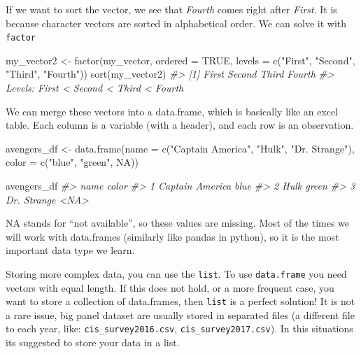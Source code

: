 \documentclass[
]{article}
\newenvironment{Shaded}{\begin{snugshade}}{\end{snugshade}}
\newcommand{\AttributeTok}[1]{\textcolor[rgb]{0.77,0.63,0.00}{#1}}
\newcommand{\CommentTok}[1]{\textcolor[rgb]{0.56,0.35,0.01}{\textit{#1}}}
\newcommand{\ConstantTok}[1]{\textcolor[rgb]{0.00,0.00,0.00}{#1}}
\newcommand{\FunctionTok}[1]{\textcolor[rgb]{0.00,0.00,0.00}{#1}}
\newcommand{\NormalTok}[1]{#1}
\newcommand{\OtherTok}[1]{\textcolor[rgb]{0.56,0.35,0.01}{#1}}
\newcommand{\StringTok}[1]{\textcolor[rgb]{0.31,0.60,0.02}{#1}}
\begin{document}
If we want to sort the vector, we see that \emph{Fourth} comes right after \emph{First}. It is because character vectors are sorted in alphabetical order. We can solve it with \texttt{factor}

\begin{Shaded}
\begin{Highlighting}[]
\NormalTok{my\_vector2 }\OtherTok{\textless{}{-}} \FunctionTok{factor}\NormalTok{(my\_vector, }\AttributeTok{ordered =} \ConstantTok{TRUE}\NormalTok{, }\AttributeTok{levels =} \FunctionTok{c}\NormalTok{(}\StringTok{"First"}\NormalTok{, }\StringTok{"Second"}\NormalTok{, }\StringTok{"Third"}\NormalTok{, }\StringTok{"Fourth"}\NormalTok{))}
\FunctionTok{sort}\NormalTok{(my\_vector2)}
\CommentTok{\#\textgreater{} [1] First  Second Third  Fourth}
\CommentTok{\#\textgreater{} Levels: First \textless{} Second \textless{} Third \textless{} Fourth}
\end{Highlighting}
\end{Shaded}

We can merge these vectors into a data.frame, which is basically like an excel table. Each column is a variable (with a header), and each row is an observation.

\begin{Shaded}
\begin{Highlighting}[]
\NormalTok{avengers\_df }\OtherTok{\textless{}{-}} \FunctionTok{data.frame}\NormalTok{(}\AttributeTok{name =} \FunctionTok{c}\NormalTok{(}\StringTok{"Captain America"}\NormalTok{, }\StringTok{"Hulk"}\NormalTok{, }\StringTok{"Dr. Strange"}\NormalTok{), }
           \AttributeTok{color =} \FunctionTok{c}\NormalTok{(}\StringTok{"blue"}\NormalTok{, }\StringTok{"green"}\NormalTok{, }\ConstantTok{NA}\NormalTok{))}

\NormalTok{avengers\_df}
\CommentTok{\#\textgreater{}              name color}
\CommentTok{\#\textgreater{} 1 Captain America  blue}
\CommentTok{\#\textgreater{} 2            Hulk green}
\CommentTok{\#\textgreater{} 3     Dr. Strange  \textless{}NA\textgreater{}}
\end{Highlighting}
\end{Shaded}

NA stands for ``not available'', so these values are missing. Most of the times we will work with data.frames (similarly like pandas in python), so it is the most important data type we learn.

Storing more complex data, you can use the \texttt{list}. To use \texttt{data.frame} you need vectors with equal length. If this does not hold, or a more frequent case, you want to store a collection of data.frames, then \texttt{list} is a perfect solution! It is not a rare issue, big panel dataset are usually stored in separated files (a different file to each year, like: \texttt{cis\_survey2016.csv}, \texttt{cis\_survey2017.csv}). In this situations its suggested to store your data in a list.
\end{document}
